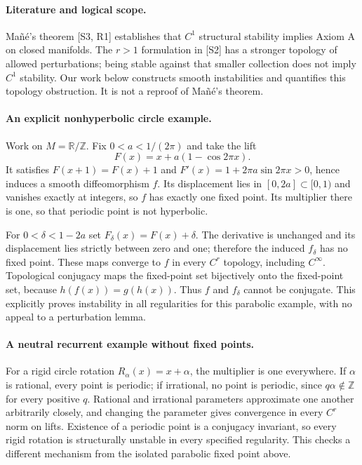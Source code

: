 \documentclass[11pt,a4paper]{article}
\begin{document}
\paragraph{Literature and logical scope.}
Ma\~n\'e's theorem [S3, R1] establishes that $C^1$ structural stability
implies Axiom A on closed manifolds. The $r>1$ formulation in [S2]
has a stronger topology of allowed perturbations; being stable against
that smaller collection does not imply $C^1$ stability. Our work below
constructs smooth instabilities and quantifies this topology obstruction.
It is not a reproof of Ma\~n\'e's theorem.

\paragraph{An explicit nonhyperbolic circle example.}
Work on $M=\mathbb R/\mathbb Z$. Fix $0<a<1/(2\pi)$ and take the lift
\[
 F(x)=x+a(1-\cos 2\pi x).
\]
It satisfies $F(x+1)=F(x)+1$ and
$F'(x)=1+2\pi a\sin2\pi x>0$, hence induces a smooth diffeomorphism
$f$. Its displacement lies in $[0,2a]\subset[0,1)$ and vanishes
exactly at integers, so $f$ has exactly one fixed point. Its multiplier
there is one, so that periodic point is not hyperbolic.

For $0<\delta<1-2a$ set $F_\delta(x)=F(x)+\delta$. The derivative
is unchanged and its displacement lies strictly between zero and one;
therefore the induced $f_\delta$ has no fixed point. These maps converge
to $f$ in every $C^r$ topology, including $C^\infty$. Topological
conjugacy maps the fixed-point set bijectively onto the fixed-point set,
because $h(f(x))=g(h(x))$. Thus $f$ and $f_\delta$ cannot be conjugate.
This explicitly proves instability in all regularities for this parabolic
example, with no appeal to a perturbation lemma.

\paragraph{A neutral recurrent example without fixed points.}
For a rigid circle rotation $R_\alpha(x)=x+\alpha$, the multiplier
is one everywhere. If $\alpha$ is rational, every point is periodic;
if irrational, no point is periodic, since $q\alpha\notin\mathbb Z$
for every positive $q$. Rational and irrational parameters approximate
one another arbitrarily closely, and changing the parameter gives
convergence in every $C^r$ norm on lifts. Existence of a periodic point
is a conjugacy invariant, so every rigid rotation is structurally
unstable in every specified regularity. This checks a different
mechanism from the isolated parabolic fixed point above.
\end{document}
